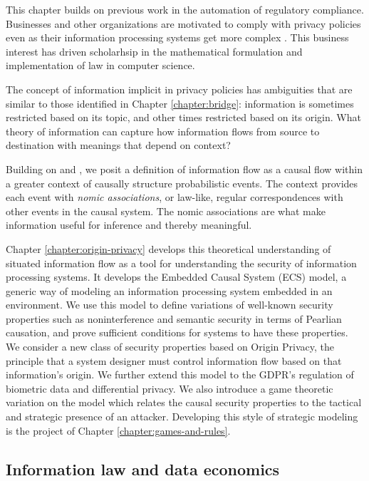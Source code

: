 \documentclass[../thesis.tex]{subfiles}
\begin{document}
 This chapter builds on previous work in the automation of
 regulatory compliance.
 Businesses and other organizations are motivated to comply
 with privacy policies even as their information
 processing systems get more complex \cite{barth2007privacy}
 \cite{deyoung2010experiences} \cite{sen2014bootstrapping}.
 This business interest has driven scholarhsip in the
 mathematical formulation and implementation of law
 in computer science.

 The concept of information implicit in privacy policies
 has ambiguities that are similar to those identified
 in Chapter \ref{chapter:bridge}: information is sometimes
 restricted based on its topic, and other times restricted
 based on its origin.
 What theory of information can capture how information
 flows from source to destination with meanings that depend
 on context?

 Building on \citet{dretske1981knowledge}
 and \citet{pearl2009causality}, we posit a definition
 of information flow as a causal flow within a greater
 context of causally structure probabilistic events.
 The context provides each event with
 \textit{nomic associations}, or law-like, regular
 correspondences with other events in the causal system.
 The nomic associations are what make information useful
 for inference and thereby meaningful.

 Chapter \ref{chapter:origin-privacy} develops this
 theoretical understanding of situated information flow as a
 tool for understanding the security of information processing
 systems.
 It develops the Embedded Causal System (ECS) model,
 a generic way of modeling an information processing system
 embedded in an environment.
 We use this model to define variations of well-known
 security properties such as noninterference and semantic
 security in terms of Pearlian causation,
 and prove sufficient conditions for systems to have these
 properties.
 We consider a new class of security properties based on
 Origin Privacy, the principle that a system designer
 must control information flow based on that information's
 origin.
 We further extend this model to the GDPR's regulation of
 biometric data and differential privacy.
 We also introduce a game theoretic variation on the model
 which relates the causal security properties to the tactical
 and strategic presence of an attacker.
 Developing this style of strategic modeling is the
 project of Chapter \ref{chapter:games-and-rules}.

 \subsection{Information law and data economics}
\end{document}
